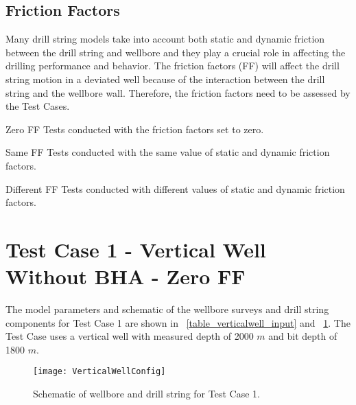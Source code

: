 \subsection{Friction Factors}
Many drill string models take into account both static and dynamic friction between the drill string and wellbore and they play a crucial role in affecting the drilling performance and behavior.  The friction factors (FF) will affect the drill string motion in a deviated well because of the interaction between the drill string and the wellbore wall.  Therefore, the friction factors need to be assessed by the Test Cases.

\begin{definition}{Zero FF}
Tests conducted with the friction factors set to zero.
\end{definition}
\begin{definition}{Same FF}
Tests conducted with the same value of static and dynamic friction factors.
\end{definition}
\begin{definition}{Different FF}
Tests conducted with different values of static and dynamic friction factors.
\end{definition}

\section{Test Case 1 - Vertical Well Without BHA - Zero FF}
The model parameters and schematic of the wellbore surveys and drill string components for Test Case 1 are shown in \tablename~\ref{table_verticalwell_input} and \figurename~\ref{figure_verticalwell}. The Test Case uses a vertical well with measured depth of 2000 $m$ and bit depth of 1800 $m$.

\begin{figure}
  \centering
  \texttt{[image: VerticalWellConfig]}
  \caption[Schematic of wellbore and drill string for Test Case 1]{Schematic of wellbore and drill string for Test Case 1.}\label{figure_verticalwell}
\end{figure}


